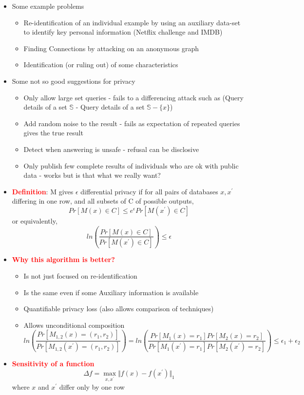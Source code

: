 \documentclass{article}
\newcommand{\redb}[1]{\textcolor{red}{\textbf{#1}}}
\begin{document}
\begin{itemize}
    \item Some example problems
        \begin{itemize}
            \item Re-identification of an individual example by using an auxiliary data-set to identify key personal information (Netflix challenge and IMDB)
            \item Finding Connections by attacking on an anonymous graph
            \item Identification (or ruling out) of  some characteristics
        \end{itemize}
    \item Some not so good suggestions for privacy
        \begin{itemize}
            \item Only allow large set queries - fails to a differencing attack such as (Query details of a set $\mathbb{S}$ - Query details of a set $\mathbb{S}-\{x\}$)
            \item Add random noise to the result - fails as expectation of repeated queries gives the true result
            \item Detect when answering is unsafe - refusal can be disclosive
            \item Only publish few complete results of individuals who are ok with public data - works but is that what we really want?
        \end{itemize}
    \item \redb{Definition}: M gives $\epsilon$ differential privacy if for all pairs of databases $x, x^\prime$ differing in one row, and all subsets of C of possible outputs,
    $$Pr[M(x) \in C] \leq e^\epsilon Pr[M(x^\prime) \in C]$$
    or equivalently,
    $$ln\left( \frac{Pr[M(x) \in C]}{Pr[M(x^\prime) \in C]} \right) \leq \epsilon$$
    \item \redb{Why this algorithm is better?}
        \begin{itemize}
            \item Is not just focused on re-identification
            \item Is the same even if some Auxiliary information is available
            \item Quantifiable privacy loss (also allows comparison of techniques)
            \item Allows unconditional composition
                $$ln\left( \frac{Pr[M_{1,2}(x) = (r_1, r_2)]}{Pr[M_{1,2}(x^\prime) = (r_1, r_2)]} \right) = ln\left( \frac{Pr[M_1(x) = r_1]Pr[M_2(x) = r_2]}{Pr[M_1(x^\prime) = r_1]Pr[M_2(x^\prime) = r_2]} \right) \leq \epsilon_1+\epsilon_2$$
        \end{itemize}
    \item \redb{Sensitivity of a function}
        $$\Delta f = \max_{x, x^\prime} \Vert f(x)-f(x^\prime) \Vert_1$$
        where $x$ and $x^\prime$ differ only by one row
\end{itemize}
\end{document}
